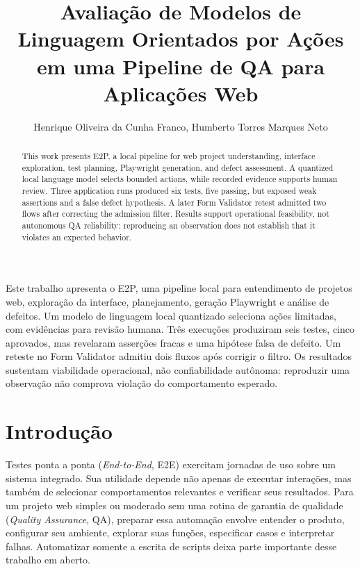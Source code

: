 \documentclass[12pt]{article}
\title{Avaliação de Modelos de Linguagem Orientados por Ações em uma Pipeline de QA para Aplicações Web}
\author{Henrique Oliveira da Cunha Franco\inst{1}, Humberto Torres Marques Neto\inst{1}}
\begin{document}
\maketitle
\begin{otherlanguage}{english}
\begin{abstract}
This work presents E2P, a local pipeline for web project understanding, interface exploration, test planning, Playwright generation, and defect assessment. A quantized local language model selects bounded actions, while recorded evidence supports human review. Three application runs produced six tests, five passing, but exposed weak assertions and a false defect hypothesis. A later Form Validator retest admitted two flows after correcting the admission filter. Results support operational feasibility, not autonomous QA reliability: reproducing an observation does not establish that it violates an expected behavior.
\end{abstract}
\end{otherlanguage}
\begin{resumo}
Este trabalho apresenta o E2P, uma pipeline local para entendimento de projetos web, exploração da interface, planejamento, geração Playwright e análise de defeitos. Um modelo de linguagem local quantizado seleciona ações limitadas, com evidências para revisão humana. Três execuções produziram seis testes, cinco aprovados, mas revelaram asserções fracas e uma hipótese falsa de defeito. Um reteste no Form Validator admitiu dois fluxos após corrigir o filtro. Os resultados sustentam viabilidade operacional, não confiabilidade autônoma: reproduzir uma observação não comprova violação do comportamento esperado.
\end{resumo}

\section{Introdução}\label{sec:intro}
Testes ponta a ponta (\textit{End-to-End}, E2E) exercitam jornadas de uso sobre um sistema integrado. Sua utilidade depende não apenas de executar interações, mas também de selecionar comportamentos relevantes e verificar seus resultados. Para um projeto web simples ou moderado sem uma rotina de garantia de qualidade (\textit{Quality Assurance}, QA), preparar essa automação envolve entender o produto, configurar seu ambiente, explorar suas funções, especificar casos e interpretar falhas. Automatizar somente a escrita de scripts deixa parte importante desse trabalho em aberto.
\end{document}
